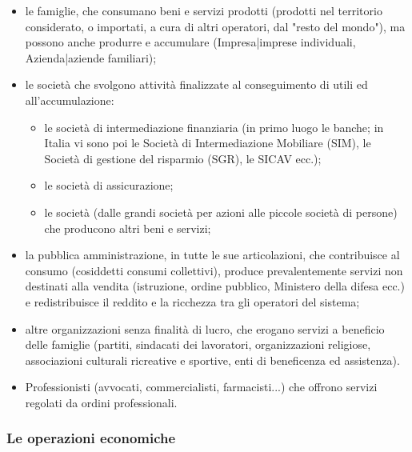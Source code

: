 \begin{itemize} [noitemsep]
\item le famiglie, che consumano beni e servizi prodotti (prodotti nel 
territorio considerato, o importati, a cura di altri operatori, dal "resto del 
mondo"), ma possono anche produrre e accumulare (Impresa|imprese 
individuali, Azienda|aziende familiari);
\item le società che svolgono attività finalizzate al 
conseguimento di utili ed all'accumulazione:
  \begin{itemize} [noitemsep]
  \item le società di intermediazione finanziaria (in primo luogo le banche; 
  in Italia vi sono poi le Società di Intermediazione Mobiliare (SIM), le 
  Società di gestione del risparmio (SGR), le SICAV ecc.);
  \item le società di assicurazione;
  \item le società (dalle grandi società per azioni alle piccole società di 
  persone) che producono altri beni e servizi;
  \end{itemize}
\item la pubblica amministrazione, in tutte le sue articolazioni, che 
contribuisce al consumo (cosiddetti consumi collettivi), produce 
prevalentemente servizi non destinati alla vendita (istruzione, ordine 
pubblico, 
Ministero della difesa ecc.) e redistribuisce il reddito e la ricchezza 
tra gli operatori del sistema;
\item altre organizzazioni senza finalità di lucro, che erogano servizi a 
beneficio 
delle famiglie (partiti, sindacati dei 
lavoratori, organizzazioni religiose, associazioni culturali ricreative e 
sportive, enti di beneficenza ed assistenza).
\item Professionisti (avvocati, commercialisti, farmacisti...) che offrono 
servizi 
regolati da ordini professionali.
\end{itemize}

\subsubsection{Le operazioni economiche}


